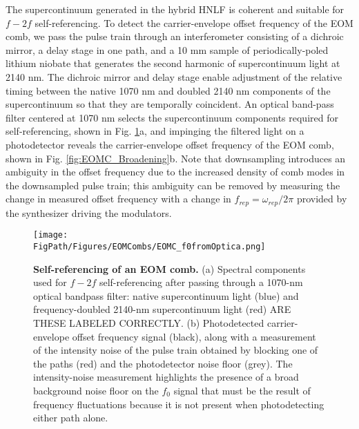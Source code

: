 

The supercontinuum generated in the hybrid HNLF is coherent and suitable for $f-2f$ self-referencing. To detect the carrier-envelope offset frequency of the EOM comb, we pass the pulse train through an interferometer consisting of a dichroic mirror, a delay stage in one path, and a 10 mm sample of periodically-poled lithium niobate that generates the second harmonic of supercontinuum light at 2140 nm.  The dichroic mirror and delay stage enable adjustment of the relative timing between the native 1070 nm and doubled 2140 nm components of the supercontinuum so that they are temporally coincident. An optical band-pass filter centered at 1070 nm selects the supercontinuum components required for self-referencing, shown in Fig. \ref{fig:EOMC_f0}a, and impinging the filtered light on a photodetector reveals the carrier-envelope offset frequency of the EOM comb, shown in Fig. \ref{fig:EOMC_Broadening}b. Note that downsampling introduces an ambiguity in the offset frequency due to the increased density of comb modes in the downsampled pulse train; this ambiguity can be removed by measuring the change in measured offset frequency with a change in $f_{rep}=\omega_{rep}/2\pi$ provided by the synthesizer driving the modulators. 




\begin{figure}[htpb]
	\begin{center}
		\texttt{[image: \\FigPath/Figures/EOMCombs/EOMC\_f0fromOptica.png]}
	\end{center}
	\caption[Figure Title]{\textbf{Self-referencing of an EOM comb.} (a) Spectral components used for $f-2f$ self-referencing after passing through a 1070-nm optical bandpass filter: \color{red}native supercontinuum light (blue) and frequency-doubled 2140-nm supercontinuum light (red) ARE THESE LABELED CORRECTLY\color{black}. (b) Photodetected carrier-envelope offset frequency signal (black), along with a measurement of the intensity noise of the pulse train obtained by \color{red} blocking one of the paths (red) \color{black}and the photodetector noise floor (grey). \color{red}The intensity-noise measurement highlights the presence of a broad background noise floor  on the $f_0$ signal that must be the result of frequency fluctuations because it is not present when photodetecting either path alone.\color{black}}
	\label{fig:EOMC_f0}
\end{figure} 



